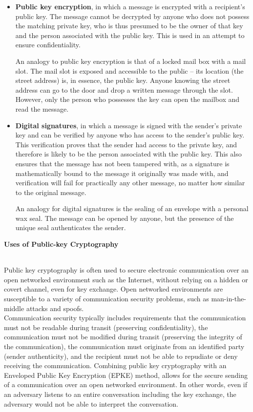 \documentclass[12 pt]{article}
\begin{document}
\begin{itemize}

\item \textbf{Public key encryption}, in which a message is encrypted with a recipient's public key. The message cannot be decrypted by anyone who does not possess the matching private key, who is thus presumed to be the owner of that key and the person associated with the public key. This is used in an attempt to ensure confidentiality.

An analogy to public key encryption is that of a locked mail box with a mail slot. The mail slot is exposed and accessible to the public – its location (the street address) is, in essence, the public key. Anyone knowing the street address can go to the door and drop a written message through the slot. However, only the person who possesses the key can open the mailbox and read the message.
\\
\item \textbf{Digital signatures}, in which a message is signed with the sender's private key and can be verified by anyone who has access to the sender's public key. This verification proves that the sender had access to the private key, and therefore is likely to be the person associated with the public key. This also ensures that the message has not been tampered with, as a signature is mathematically bound to the message it originally was made with, and verification will fail for practically any other message, no matter how similar to the original message.


An analogy for digital signatures is the sealing of an envelope with a personal wax seal. The message can be opened by anyone, but the presence of the unique seal authenticates the sender.
\end{itemize}

\pagebreak

\begin{Large}
\noindent \textbf{{Uses of Public-key Cryptography}}
\end{Large}\\[12pt]

\noindent Public key cryptography is often used to secure electronic communication over an open networked environment such as the Internet, without relying on a hidden or covert channel, even for key exchange. Open networked environments are susceptible to a variety of communication security problems, such as man-in-the-middle attacks and spoofs. \\[6pt]
Communication security typically includes requirements that the communication must not be readable during transit (preserving confidentiality), the communication must not be modified during transit (preserving the integrity of the communication), the communication must originate from an identified party (sender authenticity), and the recipient must not be able to repudiate or deny receiving the communication. Combining public key cryptography with an Enveloped Public Key Encryption (EPKE) method, allows for the secure sending of a communication over an open networked environment. In other words, even if an adversary listens to an entire conversation including the key exchange, the adversary would not be able to interpret the conversation.
\end{document}
